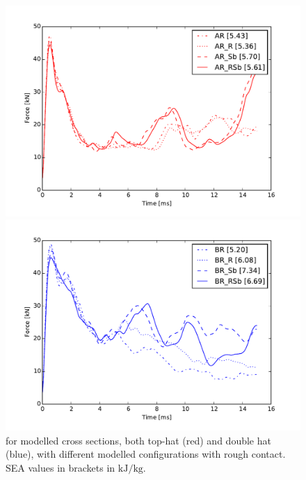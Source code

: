\documentclass[
documentsize = a4, %
font = cmr, %
typesize = 11, %
printmode = true,
onehalfspacing = true,
language = en, %
titlepage = udciccp, %
degree = pt, %
dedication = true,
acknowledgements = true,
abstract-en = true,
abstract-es = false,
abstract-ga = false,
epigraphs = true,
toc = true,
lof = true,
lot = true,
frontmatterintoc = false,
notation = false,
minimal = false,
]{UDCthesis}
\begin{document}
\begin{figure}
	\centering
	\begin{minipage}[b]{.9\linewidth}
		\centering
		\includegraphics[width=\linewidth]{IMG_CUTRES/AR}
	\end{minipage}
	\quad
	\begin{minipage}[b]{.9\linewidth}
		\centering
		\includegraphics[width=\linewidth]{IMG_CUTRES/BR}
	\end{minipage}
	\caption[ for modelled cross sections, both top-hat and double hat, with different modelled configurations with rough contact.]{ for modelled cross sections, both top-hat (red) and double hat (blue), with different modelled configurations with rough contact. \Gls{SEA} values in brackets in $\si{\kJ/\kg}$.}
	\label{fig:F-D_rough}
\end{figure}
\end{document}
